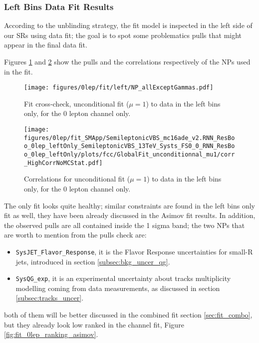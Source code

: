 \subsubsection{Left Bins Data Fit Results}
According to the unblinding strategy, the fit model is inspected in the left side of our SRs using data fit; 
the goal is to spot some problematics pulls that might appear in the final data fit.

Figures \ref{fig:fit_0lep_fcc_left} and \ref{fig:fit_0lep_corr_left} show the pulls and the correlations respectively of the NPs used in the fit.
\begin{figure}[ht]
      \centering
        \texttt{[image: figures/0lep/fit/left/NP\_allExceptGammas.pdf]}
        \caption{Fit cross-check, unconditional fit ($\mu=1$) to data in the left bins only, for the 0 lepton channel only.}
       \label{fig:fit_0lep_fcc_left}
\end{figure}
\begin{figure}[ht]
      \centering
        \texttt{[image: figures/0lep/fit\_SMApp/SemileptonicVBS\_mc16ade\_v2.RNN\_ResBoo\_0lep\_leftOnly\_SemileptonicVBS\_13TeV\_Systs\_FS0\_0\_RNN\_ResBoo\_0lep\_leftOnly/plots/fcc/GlobalFit\_unconditionnal\_mu1/corr\_HighCorrNoMCStat.pdf]}
        \caption{Correlations for unconditional fit ($\mu=1$) to data in the left bins only, for the 0 lepton channel only.}
       \label{fig:fit_0lep_corr_left}
\end{figure}

The \zlep only fit looks quite healthy;
similar constraints are found in the left bins only fit as well, 
they have been already discussed in the Asimov fit results. 
In addition, the observed pulls are all contained inside the 1 sigma band; 
the two NPs that are worth to mention from the pulls check are:

\begin{itemize}
      \item \texttt{SysJET\_Flavor\_Response}, it is the Flavor Response uncertainties for small-R jets, 
      introduced in section \ref{subsec:bkg_uncer_qg}.

      \item \texttt{SysQG\_exp}, it is an experimental uncertainty about tracks multiplicity modelling
      coming from data measurements, as discussed in section \ref{subsec:tracks_uncer}.

\end{itemize}

both of them will be better discussed in the combined fit section \ref{sec:fit_combo},
but they already look low ranked in the \zlep channel fit, Figure \ref{fig:fit_0lep_ranking_asimov}.

